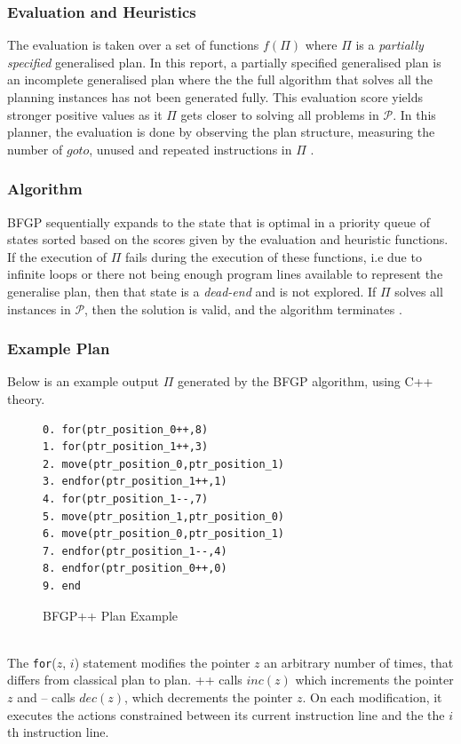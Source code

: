 \subsubsection{Evaluation and Heuristics}
The evaluation is taken over a set of functions $f(\Pi)$ where $\Pi$ is a \textit{partially specified} generalised plan. In this report, a partially specified generalised plan is an incomplete generalised plan where the the full algorithm that solves all the planning instances has not been generated fully. This evaluation score yields stronger positive values as it $\Pi$ gets closer to solving all problems in $\mathcal{P}$. In this planner, the evaluation is done by observing the plan structure, measuring the number of $goto$, unused and repeated instructions in $\Pi$ \cite{segovia-aguas_generalized_2021}.

\subsubsection{Algorithm}
BFGP sequentially expands to the state that is optimal in a priority queue of states sorted based on the scores given by the evaluation and heuristic functions. If the execution of $\Pi$ fails during the execution of these functions, i.e due to infinite loops or there not being enough program lines available to represent the generalise plan, then that state is a \textit{dead-end} and is not explored. If $\Pi$ solves all instances in $\mathcal{P}$, then the solution is valid, and the algorithm terminates \cite{segovia-aguas_generalized_2021}.

\subsubsection{Example Plan}
Below is an example output $\Pi$ generated by the BFGP algorithm, using C++ theory.
\begin{figure}[h!]
\centering
\begin{BVerbatim}
0. for(ptr_position_0++,8)
1. for(ptr_position_1++,3)
2. move(ptr_position_0,ptr_position_1)
3. endfor(ptr_position_1++,1)
4. for(ptr_position_1--,7)
5. move(ptr_position_1,ptr_position_0)
6. move(ptr_position_0,ptr_position_1)
7. endfor(ptr_position_1--,4)
8. endfor(ptr_position_0++,0)
9. end
\end{BVerbatim}
\caption{BFGP++ Plan Example}
\end{figure}
\\The \texttt{for}($z$, $i$) statement modifies the pointer $z$ an arbitrary number of times, that differs from classical plan to plan. ++ calls $inc(z)$ which increments the pointer $z$ and -- calls $dec(z)$, which decrements the pointer $z$. On each modification, it executes the actions constrained between its current instruction line and the the $i$th instruction line.

